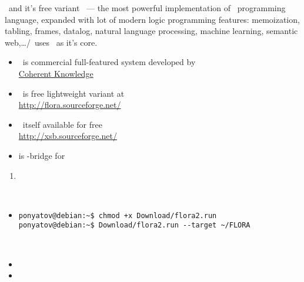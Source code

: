 \secrel{\ergo/\flora}\secdown

\ergo\ and it's free variant \flora\ --- the most powerful implementation of
\prolog\ programming language, expanded with lot of modern logic programming
features: memoization, tabling, frames, datalog, natural language processing,
machine learning, semantic web,\ldots \ergo/\flora\ uses \xsb\ as it's core.

\begin{itemize}[nosep]
  \item \ergo\ is commercial full-featured system developed by\\
  \href{http://coherentknowledge.com/product-overview-ergo-suite-platform/}{Coherent
  Knowledge}
  \item \flora\ is free lightweight variant at\\
  \url{http://flora.sourceforge.net/}
  \item \xsb\ itself available for free\\
  \url{http://xsb.sourceforge.net/}
  \item \href{http://interprolog.com/java-bridge/}{} is
  \java-bridge for \xsb
\end{itemize}


\begin{enumerate}[nosep]
  \item 
{}
\end{enumerate}

\secp{\linux}\ \\

\begin{itemize}[nosep]
  \item 
{}
\begin{verbatim}
ponyatov@debian:~$ chmod +x Download/flora2.run
ponyatov@debian:~$ Download/flora2.run --target ~/FLORA
\end{verbatim}
\end{itemize}

\secp{\win}\ \\

\begin{itemize}[nosep]
  \item 
{}
  \item 
{}
\end{itemize}

